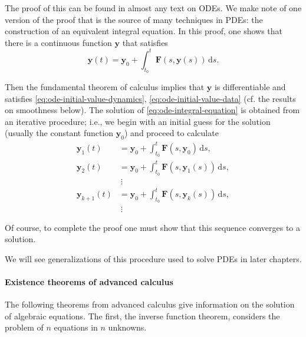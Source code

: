The proof of this can be found in almost any text on ODEs. We make note of one version of the proof that is the source of many techniques in PDEs: the construction of an equivalent integral equation. In this proof, one shows that there is a continuous function $\bm{y}$ that satisfies
\begin{equation}\label{eq:ode-integral-equation}
\bm{y}(t)=\bm{y}_0+\int_{t_0}^t\bm{F}(s,\bm{y}(s))\,\mathrm{d}s.
\end{equation}

Then the fundamental theorem of calculus implies that $\bm{y}$ is differentiable and satisfies \eqref{eq:ode-initial-value-dynamics}, \eqref{eq:ode-initial-value-data} (cf. the results on smoothness below). The solution of \eqref{eq:ode-integral-equation} is obtained from an iterative procedure; i.e., we begin with an initial guess for the solution (usually the constant function $\bm{y}_0$) and proceed to calculate
\begin{equation}\label{eq:picard-iteration}
\begin{aligned}
\bm{y}_1(t)&=\bm{y}_0+\displaystyle\int_{t_0}^t\bm{F}(s,\bm{y}_0)\,\mathrm{d}s,\\
\bm{y}_2(t)&=\bm{y}_0+\displaystyle\int_{t_0}^t\bm{F}(s,\bm{y}_1(s))\,\mathrm{d}s,\\
&\ \vdots\\
\bm{y}_{k+1}(t)&=\bm{y}_0+\displaystyle\int_{t_0}^t\bm{F}(s,\bm{y}_k(s))\,\mathrm{d}s,\\
&\ \vdots
\end{aligned}
\end{equation}

Of course, to complete the proof one must show that this sequence converges to a solution.

We will see generalizations of this procedure used to solve PDEs in later chapters.

\paragraph*{Existence theorems of advanced calculus}

The following theorems from advanced calculus give information on the solution of algebraic equations. The first, the inverse function theorem, considers the problem of $n$ equations in $n$ unknowns.

